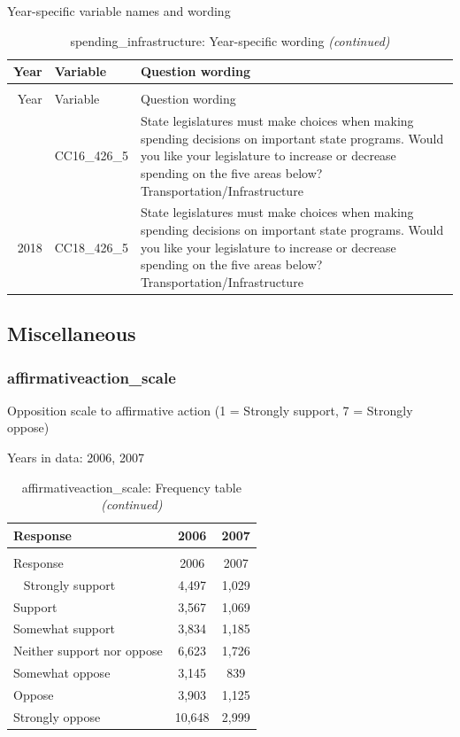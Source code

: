 \documentclass[12pt]{article}
\begin{document}
\endgroup{}

Year-specific variable names and wording

\begin{longtable}[t]{rl>{\raggedright\arraybackslash}p{10cm}}
\caption{\label{tab:unnamed-chunk-4}spending\_infrastructure: Year-specific wording}\\
\toprule
Year & Variable & Question wording\\
\midrule
\endfirsthead
\caption[]{spending\_infrastructure: Year-specific wording \textit{(continued)}}\\
\toprule
Year & Variable & Question wording\\
\midrule
\endhead
\
\endfoot
\bottomrule
\endlastfoot
2016 & CC16\_426\_5 & State legislatures must make choices when making spending decisions on important state programs. Would you like your legislature to increase or decrease spending on the five areas below? Transportation/Infrastructure\\
2018 & CC18\_426\_5 & State legislatures must make choices when making spending decisions on important state programs. Would you like your legislature to increase or decrease spending on the five areas below? Transportation/Infrastructure\\*
\end{longtable}\newpage

\subsection{Miscellaneous}\label{miscellaneous}

\subsubsection{affirmativeaction\_scale}\label{affirmativeaction_scale}

Opposition scale to affirmative action (1 = Strongly support, 7 =
Strongly oppose)

Years in data: 2006, 2007\begingroup\fontsize{10}{12}\selectfont

\begin{longtable}[t]{lcc}
\caption{\label{tab:unnamed-chunk-4}affirmativeaction\_scale: Frequency table}\\
\toprule
Response & 2006 & 2007\\
\midrule
\endfirsthead
\caption[]{affirmativeaction\_scale: Frequency table \textit{(continued)}}\\
\toprule
Response & 2006 & 2007\\
\midrule
\endhead
\
\endfoot
\bottomrule
\endlastfoot
Strongly support & 4,497 & 1,029\\
Support & 3,567 & 1,069\\
Somewhat support & 3,834 & 1,185\\
Neither support nor oppose & 6,623 & 1,726\\
Somewhat oppose & 3,145 & 839\\
Oppose & 3,903 & 1,125\\
Strongly oppose & 10,648 & 2,999\\*
\end{longtable}
\end{document}
